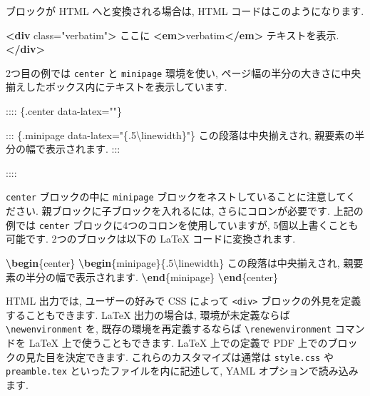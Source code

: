 \documentclass[
  11pt,
  lualatex,
  ja=standard]{bxjsreport}
\newenvironment{Shaded}{\begin{snugshade}}{\end{snugshade}}
\newcommand{\ExtensionTok}[1]{#1}
\newcommand{\FunctionTok}[1]{\textcolor[rgb]{0.00,0.00,0.00}{#1}}
\newcommand{\KeywordTok}[1]{\textcolor[rgb]{0.13,0.29,0.53}{\textbf{#1}}}
\newcommand{\NormalTok}[1]{#1}
\newcommand{\OtherTok}[1]{\textcolor[rgb]{0.56,0.35,0.01}{#1}}
\newcommand{\StringTok}[1]{\textcolor[rgb]{0.31,0.60,0.02}{#1}}
\begin{document}
ブロックが HTML へと変換される場合は, HTML コードはこのようになります.

\begin{Shaded}
\begin{Highlighting}[]
\KeywordTok{\textless{}div}\OtherTok{ class=}\StringTok{"verbatim"}\KeywordTok{\textgreater{}}
\NormalTok{ここに }\KeywordTok{\textless{}em\textgreater{}}\NormalTok{verbatim}\KeywordTok{\textless{}/em\textgreater{}}\NormalTok{ テキストを表示.}
\KeywordTok{\textless{}/div\textgreater{}}
\end{Highlighting}
\end{Shaded}

2つ目の例では \texttt{center} と \texttt{minipage} 環境を使い, ページ幅の半分の大きさに中央揃えしたボックス内にテキストを表示しています.

\begin{Shaded}
\begin{Highlighting}[]
\NormalTok{:::: \{.center data{-}latex=""\}}

\NormalTok{::: \{.minipage data{-}latex="\{.5\textbackslash{}linewidth\}"\}}
\NormalTok{この段落は中央揃えされ, 親要素の半分の幅で表示されます.}
\NormalTok{:::}

\NormalTok{::::}
\end{Highlighting}
\end{Shaded}

\texttt{center} ブロックの中に \texttt{minipage} ブロックをネストしていることに注意してください. 親ブロックに子ブロックを入れるには, さらにコロンが必要です. 上記の例では \texttt{center} ブロックに4つのコロンを使用していますが, 5個以上書くことも可能です. 2つのブロックは以下の LaTeX コードに変換されます.

\begin{Shaded}
\begin{Highlighting}[]
\KeywordTok{\textbackslash{}begin}\NormalTok{\{}\ExtensionTok{center}\NormalTok{\}}
\KeywordTok{\textbackslash{}begin}\NormalTok{\{}\ExtensionTok{minipage}\NormalTok{\}\{.5}\FunctionTok{\textbackslash{}linewidth}\NormalTok{\}}
\NormalTok{この段落は中央揃えされ, 親要素の半分の幅で表示されます.}
\KeywordTok{\textbackslash{}end}\NormalTok{\{}\ExtensionTok{minipage}\NormalTok{\}}
\KeywordTok{\textbackslash{}end}\NormalTok{\{}\ExtensionTok{center}\NormalTok{\}}
\end{Highlighting}
\end{Shaded}

HTML 出力では, ユーザーの好みで CSS によって \texttt{\textless{}div\textgreater{}} ブロックの外見を定義することもできます. LaTeX 出力の場合は, 環境が未定義ならば \texttt{\textbackslash{}newenvironment} を, 既存の環境を再定義するならば \texttt{\textbackslash{}renewenvironment} コマンドを LaTeX 上で使うこともできます. LaTeX 上での定義で PDF 上でのブロックの見た目を決定できます. これらのカスタマイズは通常は \texttt{style.css} や \texttt{preamble.tex} といったファイルを内に記述して, YAML オプションで読み込みます.
\end{document}
